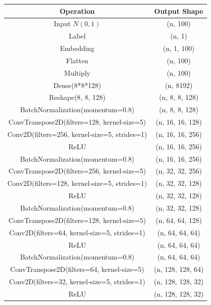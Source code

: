 \begin{center}
    \begin{table}[H]
        \centering
        \begin{tabular}{c|c}
            Operation & Output Shape \\
            \hline
            Input $N(0,1)$ & (n, 100) \\
            Label        & (n, 1) \\
            Embedding    & (n, 1, 100)\\
            Flatten      & (n, 100) \\
            Multiply     & (n, 100) \\
            Dense(8*8*128)       & (n, 8192) \\
            Reshape(8, 8, 128)      & (n, 8, 8, 128) \\
            BatchNormalization(momentum=0.8) & (n, 8, 8, 128)\\
            ConvTranspose2D(filters=128, kernel-size=5) & (n, 16, 16, 128) \\
            Conv2D(filters=256, kernel-size=5, strides=1)       & (n, 16, 16, 256) \\
            ReLU         & (n, 16, 16, 256)\\
            BatchNormalization(momentum=0.8) & (n, 16, 16, 256)\\
            ConvTranspose2D(filters=256, kernel-size=5) & (n, 32, 32, 256)\\
            Conv2D(filters=128, kernel-size=5, strides=1)      & (n, 32, 32, 128)\\
            ReLU         & (n, 32, 32, 128)\\
            BatchNormalization(momentum=0.8) & (n, 32, 32, 128)\\
            ConvTranspose2D(filters=128, kernel-size=5) & (n, 64, 64, 128)\\
            Conv2D(filters=64, kernel-size=5, strides=1) & (n, 64, 64, 64)\\
            ReLU         & (n, 64, 64, 64)\\
            BatchNormalization(momentum=0.8) & (n, 64, 64, 64)\\
            ConvTranspose2D(filters=64, kernel-size=5) & (n, 128, 128, 64)\\
            Conv2D(filters=32, kernel-size=5, strides=1)       & (n, 128, 128, 32)\\
            ReLU         & (n, 128, 128, 32)\\

\end{tabular}
\end{table}
\end{center}
